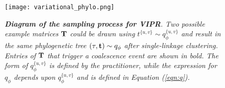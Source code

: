 \begin{figure}[ht]
    \centering
    \texttt{[image: variational\_phylo.png]}
    \caption{\emph{{\bf \emph{Diagram of the sampling process for VIPR}}. Two possible example matrices $\mathbf{T}$ could be drawn using $t^{\{u,v\}} \sim q_\phi^{\{u,v\}}$ and result in the same phylogenetic tree $(\tau,\mathbf{t}) \sim q_\phi$ after single-linkage clustering. Entries of $\mathbf{T}$ that trigger a coalescence event are shown in bold. The form of $q_\phi^{\{u,v\}}$ is defined by the practitioner, while the expression for $q_\phi$ depends upon $q_\phi^{\{u,v\}}$ and is defined in Equation (\ref{eqn:q}).}}
    \label{fig:Phylo_diag}
\end{figure}